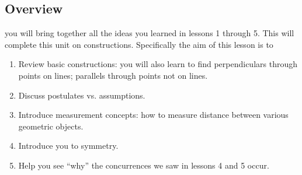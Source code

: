 \documentclass{tufte-handout}
\begin{document}
\begin{tcolorbox}[enhanced jigsaw,breakable,pad at break*=1mm,
  colback=cyan!2!white,colframe=blue!75!black,title=Student View: Slide 1,drop fuzzy shadow,watermark color=white,watermark text=\arabic{tcbbreakpart}]
  \section{Overview}
   you will bring together all the ideas you learned in lessons 1 through 5. This will complete this unit on constructions. Specifically the aim of this lesson is to 
  \begin{enumerate}
      \item Review basic constructions: you will also learn to find perpendiculars through points on lines; parallels through points not on lines. 
      \item Discuss postulates vs. assumptions. 
      \item Introduce measurement concepts: how to measure distance between various geometric objects.
      \item Introduce you to symmetry. 
      \item Help you see ``why'' the concurrences we saw in lessons 4 and 5 occur.
  \end{enumerate}
  
 
\end{tcolorbox}

\pagebreak
\end{document}
